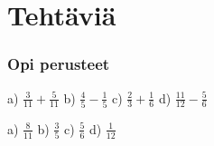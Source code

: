 
\section*{Tehtäviä}

\subsubsection*{Opi perusteet}

%
%
%



\begin{tehtava}
a) $\frac{3}{11}+\frac{5}{11}$ \qquad b) $\frac{4}{5}-\frac{1}{5}$ \qquad c) $\frac{2}{3}+\frac{1}{6}$ \qquad
d) $ \frac{11}{12}-\frac{5}{6}$
\begin{vastaus}
a) $\frac{8}{11}$ \qquad b) $\frac{3}{5}$ \qquad c) $\frac{5}{6}$ \qquad d) $\frac{1}{12}$
\end{vastaus}
\end{tehtava}

